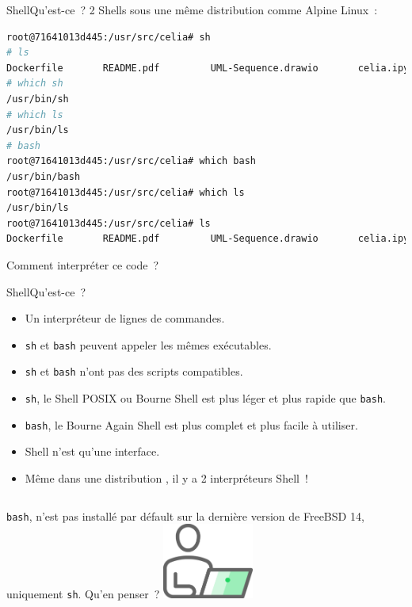 \documentclass{beamer}
\begin{document}
    \begin{frame}[fragile]{Shell}{Qu'est-ce~?}
        2 Shells sous une même distribution  comme Alpine Linux~:
        \begin{lstlisting}[language=bash]
root@71641013d445:/usr/src/celia# sh
# ls
Dockerfile       README.pdf         UML-Sequence.drawio       celia.ipynb
# which sh
/usr/bin/sh
# which ls
/usr/bin/ls
# bash
root@71641013d445:/usr/src/celia# which bash
/usr/bin/bash
root@71641013d445:/usr/src/celia# which ls
/usr/bin/ls
root@71641013d445:/usr/src/celia# ls
Dockerfile       README.pdf         UML-Sequence.drawio       celia.ipynb
        \end{lstlisting}
        \bigbreak
        Comment interpréter ce code~?
    \end{frame}

    \begin{frame}{Shell}{Qu'est-ce~?}
        \begin{itemize}
            \item Un interpréteur de lignes de commandes.
            \item \lstinline{sh} et \lstinline{bash} peuvent appeler les mêmes exécutables.
            \item \lstinline{sh} et \lstinline{bash} n'ont pas des scripts compatibles.
            \item \lstinline{sh}, le Shell POSIX ou Bourne Shell est plus léger et plus rapide que \lstinline{bash}.
            \item \lstinline{bash}, le Bourne Again Shell est plus complet et plus facile à utiliser.
            \item Shell n'est qu'une interface.
            \item Même dans une distribution , il y a 2 interpréteurs Shell~!
        \end{itemize}
        \begin{columns}
            \lstinline{bash}, n'est pas installé par défault sur la dernière version de FreeBSD 14, uniquement \lstinline{sh}.
            Qu'en penser~?
            \centering
            \includegraphics[width=3cm]{image/guy-in-front-of-desktop}
        \end{columns}
    \end{frame}
\end{document}
